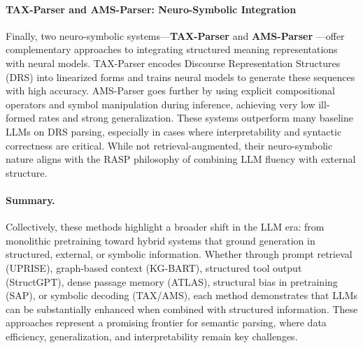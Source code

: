 \paragraph{TAX-Parser and AMS-Parser: Neuro-Symbolic Integration}

Finally, two neuro-symbolic systems—\textbf{TAX-Parser} \citep{zhang2024taxparser} and \textbf{AMS-Parser} \citep{yang2024amsparser}—offer complementary approaches to integrating structured meaning representations with neural models. TAX-Parser encodes Discourse Representation Structures (DRS) into linearized forms and trains neural models to generate these sequences with high accuracy. AMS-Parser goes further by using explicit compositional operators and symbol manipulation during inference, achieving very low ill-formed rates and strong generalization. These systems outperform many baseline LLMs on DRS parsing, especially in cases where interpretability and syntactic correctness are critical. While not retrieval-augmented, their neuro-symbolic nature aligns with the RASP philosophy of combining LLM fluency with external structure.

\paragraph{Summary.} Collectively, these methods highlight a broader shift in the LLM era: from monolithic pretraining toward hybrid systems that ground generation in structured, external, or symbolic information. Whether through prompt retrieval (UPRISE), graph-based context (KG-BART), structured tool output (StructGPT), dense passage memory (ATLAS), structural bias in pretraining (SAP), or symbolic decoding (TAX/AMS), each method demonstrates that LLMs can be substantially enhanced when combined with structured information. These approaches represent a promising frontier for semantic parsing, where data efficiency, generalization, and interpretability remain key challenges.
